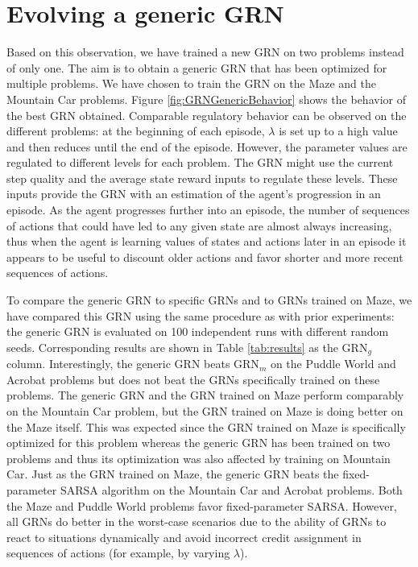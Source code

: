 \section{Evolving a generic GRN}
Based on this observation, we have trained a new GRN on two problems instead of only one. The aim is to obtain a generic GRN that has been optimized for multiple problems. We have chosen to train the GRN on the Maze and the Mountain Car problems. Figure \ref{fig:GRNGenericBehavior} shows the behavior of the best GRN obtained. Comparable regulatory behavior can be observed on the different problems: at the beginning of each episode, $\lambda$ is set up to a high value and then reduces until the end of the episode. However, the parameter values are regulated to different levels for each problem. The GRN might use the current step quality and the average state reward inputs to regulate these levels. These inputs provide the GRN with an estimation of the agent's progression in an episode. As the agent progresses further into an episode, the number of sequences of actions that could have led to any given state are almost always increasing, thus when the agent is learning values of states and actions later in an episode it appears to be useful to discount older actions and favor shorter and more recent sequences of actions.

To compare the generic GRN to specific GRNs and to GRNs trained on Maze, we have compared this GRN using the same procedure as with prior experiments: the generic GRN is evaluated on 100 independent runs with different random seeds. Corresponding results are shown in Table \ref{tab:results} as the GRN$_g$ column. Interestingly, the generic GRN beats GRN$_m$ on the Puddle World and Acrobat problems but does not beat the GRNs specifically trained on these problems. The generic GRN and the GRN trained on Maze perform comparably on the Mountain Car problem, but the GRN trained on Maze is doing better on the Maze itself. This was expected since the GRN trained on Maze is specifically optimized for this problem whereas the generic GRN has been trained on two problems and thus its optimization was also affected by training on Mountain Car. Just as the GRN trained on Maze, the generic GRN beats the fixed-parameter SARSA algorithm on the Mountain Car and Acrobat problems. Both the Maze and Puddle World problems favor fixed-parameter SARSA. However, all GRNs do better in the worst-case scenarios due to the ability of GRNs to react to situations dynamically and avoid incorrect credit assignment in sequences of actions (for example, by varying $\lambda$).


